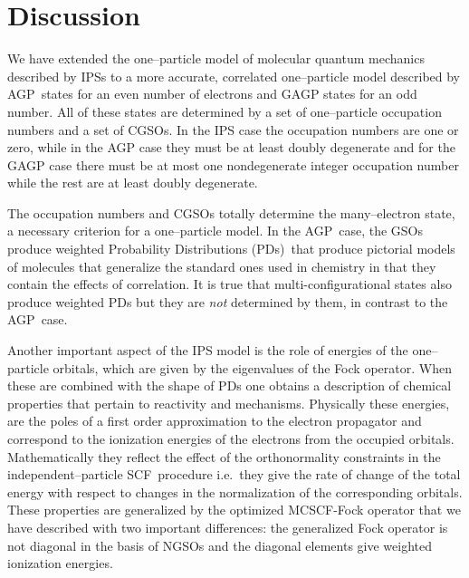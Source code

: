 \documentclass[aps,preprint]{revtex4}%
\begin{document}
\section{Discussion\label{Discussion}}

We have extended the one--particle model of molecular quantum mechanics
described by IPSs to a more accurate, correlated one--particle model described
by AGP\ states for an even number of electrons and GAGP states for an odd
number. All of these states are determined by a set of one--particle
occupation numbers and a set of CGSOs. In the IPS case the occupation numbers
are one or zero, while in the AGP case they must be at least doubly degenerate
and for the GAGP case there must be at most one nondegenerate integer
occupation number while the rest are at least doubly degenerate.

The occupation numbers and CGSOs totally determine the many--electron state, a
necessary criterion for a one--particle model. In the AGP\ case, the GSOs
produce weighted Probability Distributions (PDs)\ that produce pictorial
models of molecules that generalize the standard ones used in chemistry in
that they contain the effects of correlation. It is true that
multi-configurational states also produce weighted PDs but they are \emph{not}
determined by them, in contrast to the AGP\ case.

Another important aspect of the IPS model is the role of energies of the
one--particle orbitals, which are given by the eigenvalues of the Fock
operator. When these are combined with the shape of PDs one obtains a
description of chemical properties that pertain to reactivity and mechanisms.
Physically these energies, are the poles of a first order approximation to the
electron propagator and correspond to the ionization energies of the electrons
from the occupied orbitals. Mathematically they reflect the effect of the
orthonormality constraints in the independent--particle SCF\ procedure
i.e.\ they give the rate of change of the total energy with respect to changes
in the normalization of the corresponding orbitals. These properties are
generalized by the optimized MCSCF-Fock operator that we have described with
two important differences: the generalized Fock operator is not diagonal in
the basis of NGSOs and the diagonal elements give weighted ionization energies.
\end{document}
